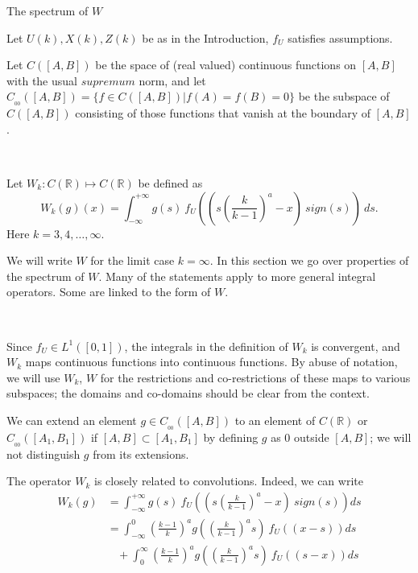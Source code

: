 \documentclass[12pt]{article}
\newenvironment{definition}[1][Definition]{\begin{trivlist}
		\item[\hskip \labelsep {\bfseries #1}]}{\end{trivlist}}
\begin{document}


\begin{section}{The spectrum of $W$ }  
	
	Let $U(k),X(k),Z(k)$ be as in the Introduction, $f_U$ satisfies assumptions.  
	
	\begin{definition} Let $C([A,B])$ be the space of (real valued) continuous functions on $[A,B]$ with the usual $supremum$ norm, and let $C_{_{0\!0}}([A,B]) = \{f \in C([A,B]) | f(A)=f(B) = 0\}$ be the subspace of $C([A,B])$ consisting of those functions that vanish at the boundary of $[A,B]$. 
		
	\  
		
	Let $W_k: C(\mathbb{R}) \longmapsto C(\mathbb{R})$ be defined as
	\begin{equation} \label{eq:Wk}
	W_k(g)(x) = \int_{-\infty}^{+\infty} g(s)\ f_U\!\left(  \left(s \left(\frac{k}{k-1}\right)^a - x \right)\ sign(s) \right) \ ds.
	\end{equation}
	Here $k=3,4,\dots, \infty$.   
	
	We will write $W$ for the limit case $k=\infty$. In this section we go over properties of the spectrum of $W$. Many of the statements apply to more general integral operators. Some are linked to the form of $W$.
	
	\
	
	Since $f_U \in L^1([0,1])$, the integrals in the definition of $W_k$ is convergent, and $W_k$ maps continuous functions into continuous functions. By abuse of notation, we will use $W_k$, $W$ for the restrictions and co-restrictions of these maps to various subspaces; the domains and co-domains should be clear from the context.  
	
	We can extend an element $g \in C_{_{0\!0}}([A,B])$ to an element of $C(\mathbb{R})$ or $C_{_{00}}([A_1,B_1])$ if $[A,B] \subset [A_1,B_1]$ by defining $g$ as $0$ outside $[A,B]$; we will not distinguish $g$ from its extensions.  
	
	The operator $W_k$ is closely related to convolutions. Indeed, we can write
	\begin{align*} 
	W_k(g) &= \int_{-\infty}^{+\infty} g(s)\ f_U\!\left(  \left(s \left(\frac{k}{k-1}\right)^a - x \right)\ sign(s) \right) ds \\
	&= \int_{-\infty}^{0} \left(\frac{k-1}{k}\right)^a g(\left(\frac{k}{k-1}\right)^a s)\ f_U\!\left(  \left(x -s \right)\right) ds 
 \\
	&\ \ \ \  +  \int_{0}^{\infty} \left(\frac{k-1}{k}\right)^a g(\left(\frac{k}{k-1}\right)^a s)\ f_U\!\left(  \left(s - x \right)\right) ds \\
	\end{align*}  
	

\end{definition}
\end{section}
\end{document}
